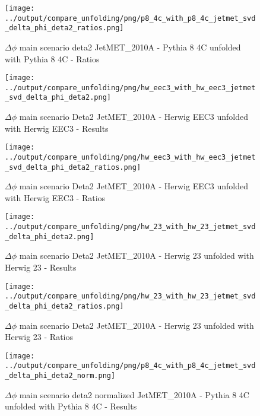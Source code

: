 \documentclass[11pt]{book}
\begin{document}
\begin{figure}[ht]
\centering
\texttt{[image: ../output/compare\_unfolding/png/p8\_4c\_with\_p8\_4c\_jetmet\_svd\_delta\_phi\_deta2\_ratios.png]}
\caption{$\Delta\phi$ main scenario deta2 JetMET\_2010A - Pythia 8 4C unfolded with Pythia 8 4C - Ratios}
\label{p8_p8_jetmet_svd_delta_phi_deta2_b}
\end{figure}

\begin{figure}[ht]
\centering
\texttt{[image: ../output/compare\_unfolding/png/hw\_eec3\_with\_hw\_eec3\_jetmet\_svd\_delta\_phi\_deta2.png]}
\caption{$\Delta\phi$ main scenario Deta2 JetMET\_2010A - Herwig EEC3 unfolded with Herwig EEC3 - Results}
\label{hw_eec3_hw_eec3_jetmet_svd_delta_phi_deta2_a}
\end{figure}

\begin{figure}[ht]
\centering
\texttt{[image: ../output/compare\_unfolding/png/hw\_eec3\_with\_hw\_eec3\_jetmet\_svd\_delta\_phi\_deta2\_ratios.png]}
\caption{$\Delta\phi$ main scenario Deta2 JetMET\_2010A - Herwig EEC3 unfolded with Herwig EEC3 - Ratios}
\label{hw_eec3_hw_eec3_jetmet_svd_delta_phi_deta2_b}
\end{figure}

\begin{figure}[ht]
\centering
\texttt{[image: ../output/compare\_unfolding/png/hw\_23\_with\_hw\_23\_jetmet\_svd\_delta\_phi\_deta2.png]}
\caption{$\Delta\phi$ main scenario Deta2 JetMET\_2010A - Herwig 23 unfolded with Herwig 23 - Results}
\label{hw_23_hw_23_jetmet_svd_delta_phi_deta2_a}
\end{figure}

\begin{figure}[ht]
\centering
\texttt{[image: ../output/compare\_unfolding/png/hw\_23\_with\_hw\_23\_jetmet\_svd\_delta\_phi\_deta2\_ratios.png]}
\caption{$\Delta\phi$ main scenario Deta2 JetMET\_2010A - Herwig 23 unfolded with Herwig 23 - Ratios}
\label{hw_23_hw_23_jetmet_svd_delta_phi_deta2_b}
\end{figure}


\begin{figure}[ht]
\centering
\texttt{[image: ../output/compare\_unfolding/png/p8\_4c\_with\_p8\_4c\_jetmet\_svd\_delta\_phi\_deta2\_norm.png]}
\caption{$\Delta\phi$ main scenario deta2 normalized JetMET\_2010A - Pythia 8 4C unfolded with Pythia 8 4C - Results}
\label{p8_p8_jetmet_svd_delta_phi_deta2_norm_a}
\end{figure}
\end{document}
